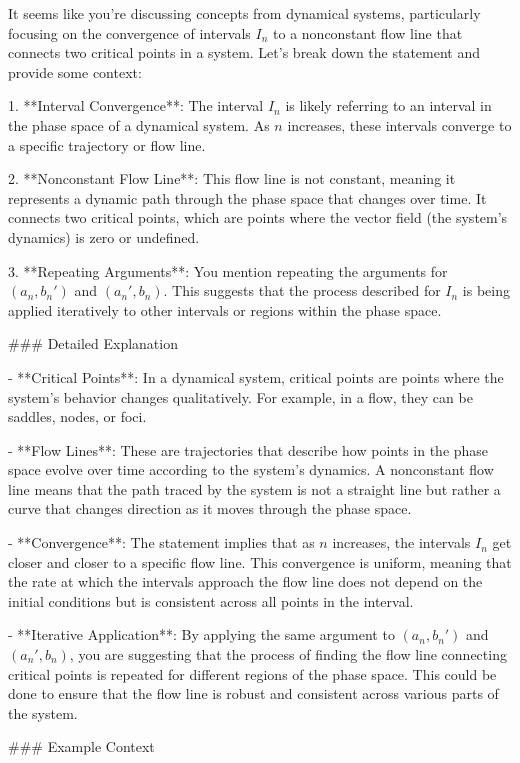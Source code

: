 It seems like you're discussing concepts from dynamical systems, particularly focusing on the convergence of intervals \(I_n\) to a nonconstant flow line that connects two critical points in a system. Let's break down the statement and provide some context:

1. **Interval Convergence**: The interval \(I_n\) is likely referring to an interval in the phase space of a dynamical system. As \(n\) increases, these intervals converge to a specific trajectory or flow line.

2. **Nonconstant Flow Line**: This flow line is not constant, meaning it represents a dynamic path through the phase space that changes over time. It connects two critical points, which are points where the vector field (the system's dynamics) is zero or undefined.

3. **Repeating Arguments**: You mention repeating the arguments for \((a_n, b_n')\) and \((a_n', b_n)\). This suggests that the process described for \(I_n\) is being applied iteratively to other intervals or regions within the phase space.

### Detailed Explanation

- **Critical Points**: In a dynamical system, critical points are points where the system's behavior changes qualitatively. For example, in a flow, they can be saddles, nodes, or foci.
  
- **Flow Lines**: These are trajectories that describe how points in the phase space evolve over time according to the system's dynamics. A nonconstant flow line means that the path traced by the system is not a straight line but rather a curve that changes direction as it moves through the phase space.

- **Convergence**: The statement implies that as \(n\) increases, the intervals \(I_n\) get closer and closer to a specific flow line. This convergence is uniform, meaning that the rate at which the intervals approach the flow line does not depend on the initial conditions but is consistent across all points in the interval.

- **Iterative Application**: By applying the same argument to \((a_n, b_n')\) and \((a_n', b_n)\), you are suggesting that the process of finding the flow line connecting critical points is repeated for different regions of the phase space. This could be done to ensure that the flow line is robust and consistent across various parts of the system.

### Example Context

